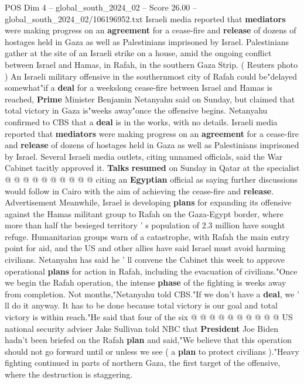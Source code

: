 \begin{textsample}{POS Dim 4 – global\_south\_2024\_02 – Score 26.00 – global\_south\_2024\_02/106196952.txt}  \label{ex:f4_pos_073}
Israeli media reported that \textbf{mediators} were making progress on an \textbf{agreement} for a cease-fire and \textbf{release} of dozens of hostages held in Gaza as well as Palestinians imprisoned by Israel.
Palestinians gather at the site of an Israeli strike on a house, amid the ongoing conflict between Israel and Hamas, in Rafah, in the southern Gaza Strip. ( Reuters photo ) An Israeli military offensive in the southernmost city of Rafah could be"delayed somewhat"if a \textbf{deal} for a weekslong cease-fire between Israel and Hamas is reached, \textbf{Prime} Minister Benjamin Netanyahu said on Sunday, but claimed that total victory in Gaza is"weeks away"once the offensive begins.
Netanyahu confirmed to CBS that a \textbf{deal} is in the works, with no details.
Israeli media reported that \textbf{mediators} were making progress on an \textbf{agreement} for a cease-fire and \textbf{release} of dozens of hostages held in Gaza as well as Palestinians imprisoned by Israel.
Several Israeli media outlets, citing unnamed officials, said the War Cabinet tacitly approved it. \textbf{Talks} \textbf{resumed} on Sunday in Qatar at the specialist @ @ @ @ @ @ @ @ @ @ citing an \textbf{Egyptian} official as saying further discussions would follow in Cairo with the aim of achieving the cease-fire and \textbf{release}.
Advertisement Meanwhile, Israel is developing \textbf{plans} for expanding its offensive against the Hamas militant group to Rafah on the Gaza-Egypt border, where more than half the besieged territory ' s population of 2.3 million have sought refuge.
Humanitarian groups warn of a catastrophe, with Rafah the main entry point for aid, and the US and other allies have said Israel must avoid harming civilians.
Netanyahu has said he ' ll convene the Cabinet this week to approve operational \textbf{plans} for action in Rafah, including the evacuation of civilians."Once we begin the Rafah operation, the intense \textbf{phase} of the fighting is weeks away from completion.
Not months,"Netanyahu told CBS."If we don't have a \textbf{deal}, we ' ll do it anyway.
It has to be done because total victory is our goal and total victory is within reach."He said that four of the six @ @ @ @ @ @ @ @ @ @ US national security adviser Jake Sullivan told NBC that \textbf{President} Joe Biden hadn't been briefed on the Rafah \textbf{plan} and said,"We believe that this operation should not go forward until or unless we see ( a \textbf{plan} to protect civilians )."Heavy fighting continued in parts of northern Gaza, the first target of the offensive, where the destruction is staggering.

\end{textsample}
